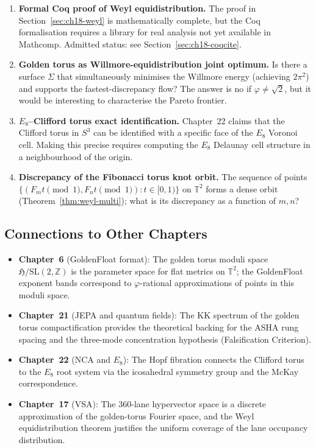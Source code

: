 \begin{enumerate}
\item \textbf{Formal Coq proof of Weyl equidistribution.} The proof in
  Section~\ref{sec:ch18-weyl} is mathematically complete, but the Coq formalisation
  requires a library for real analysis not yet available in Mathcomp.
  Admitted status: see Section~\ref{sec:ch18-coqcite}.

\item \textbf{Golden torus as Willmore-equidistribution joint optimum.}
  Is there a surface $\Sigma$ that simultaneously minimises the Willmore energy
  (achieving $2\pi^2$) and supports the fastest-discrepancy flow?
  The answer is no if $\varphi \ne \sqrt{2}$, but it would be interesting to
  characterise the Pareto frontier.

\item \textbf{$E_8$--Clifford torus exact identification.}
  Chapter~22 claims that the Clifford torus in $S^3$ can be identified with
  a specific face of the $E_8$ Voronoi cell.
  Making this precise requires computing the $E_8$ Delaunay cell structure
  in a neighbourhood of the origin.

\item \textbf{Discrepancy of the Fibonacci torus knot orbit.}
  The sequence of points $\{(F_m t \pmod{1}, F_n t \pmod{1}) : t \in [0,1)\}$
  on $\mathbb{T}^2$ forms a dense orbit (Theorem~\ref{thm:weyl-multi});
  what is its discrepancy as a function of $m,n$?
\end{enumerate}

\subsection{Connections to Other Chapters}\label{subsec:ch18-connections}

\begin{itemize}
\item \textbf{Chapter~6} (GoldenFloat format): The golden torus moduli space
  $\mathfrak{H}/\mathrm{SL}(2,\mathbb{Z})$ is the parameter space for flat metrics
  on $\mathbb{T}^2$; the GoldenFloat exponent bands correspond to $\varphi$-rational
  approximations of points in this moduli space.
\item \textbf{Chapter~21} (JEPA and quantum fields): The KK spectrum of the golden
  torus compactification provides the theoretical backing for the ASHA rung spacing
  and the three-mode concentration hypothesis (Falsification Criterion).
\item \textbf{Chapter~22} (NCA and $E_8$): The Hopf fibration connects the Clifford
  torus to the $E_8$ root system via the icosahedral symmetry group and the McKay
  correspondence.
\item \textbf{Chapter~17} (VSA): The 360-lane hypervector space is a discrete
  approximation of the golden-torus Fourier space, and the Weyl equidistribution
  theorem justifies the uniform coverage of the lane occupancy distribution.
\end{itemize}

